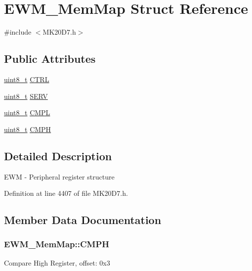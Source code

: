 \hypertarget{struct_e_w_m___mem_map}{}\section{E\+W\+M\+\_\+\+Mem\+Map Struct Reference}
\label{struct_e_w_m___mem_map}


{\ttfamily \#include $<$M\+K20\+D7.\+h$>$}

\subsection*{Public Attributes}
\begin{DoxyCompactItemize}
\item 
\hyperlink{_p_e___types_8h_aba7bc1797add20fe3efdf37ced1182c5}{uint8\+\_\+t} \hyperlink{struct_e_w_m___mem_map_a033a88d44ad1daa23ce3deb13bc94811}{C\+T\+RL}
\item 
\hyperlink{_p_e___types_8h_aba7bc1797add20fe3efdf37ced1182c5}{uint8\+\_\+t} \hyperlink{struct_e_w_m___mem_map_aa9c25d4775f785d6911e096a226f4e40}{S\+E\+RV}
\item 
\hyperlink{_p_e___types_8h_aba7bc1797add20fe3efdf37ced1182c5}{uint8\+\_\+t} \hyperlink{struct_e_w_m___mem_map_ada0221f7554297f23a0257f54f28f5fc}{C\+M\+PL}
\item 
\hyperlink{_p_e___types_8h_aba7bc1797add20fe3efdf37ced1182c5}{uint8\+\_\+t} \hyperlink{struct_e_w_m___mem_map_a88293412bcc664b463f1fef25312c4ab}{C\+M\+PH}
\end{DoxyCompactItemize}


\subsection{Detailed Description}
E\+WM -\/ Peripheral register structure 

Definition at line 4407 of file M\+K20\+D7.\+h.



\subsection{Member Data Documentation}
\subsubsection[{\texorpdfstring{C\+M\+PH}{CMPH}}]{ E\+W\+M\+\_\+\+Mem\+Map\+::\+C\+M\+PH}\hypertarget{struct_e_w_m___mem_map_a88293412bcc664b463f1fef25312c4ab}{}\label{struct_e_w_m___mem_map_a88293412bcc664b463f1fef25312c4ab}
Compare High Register, offset\+: 0x3 


